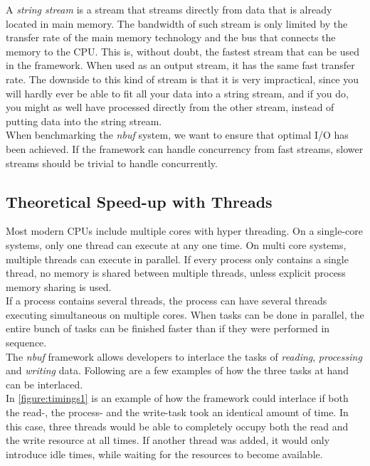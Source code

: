 \documentclass[a4paper]{article}
\newcommand{\nbuf}{\textit{nbuf} }
\begin{document}
A \textit{string stream} is a stream that streams directly from data that is already located in main memory. The bandwidth of such stream is only limited by the transfer rate of the main memory technology and the bus that connects the memory to the CPU. This is, without doubt, the fastest stream that can be used in the framework. When used as an output stream, it has the same fast transfer rate. The downside to this kind of stream is that it is very impractical, since you will hardly ever be able to fit all your data into a string stream, and if you do, you might as well have processed directly from the other stream, instead of putting data into the string stream.\\

When benchmarking the \nbuf system, we want to ensure that optimal I/O has been achieved. If the framework can handle concurrency from fast streams, slower streams should be trivial to handle concurrently.


\subsection{Theoretical Speed-up with Threads}
Most modern CPUs include multiple cores with hyper threading. On a single-core systems, only one thread can execute at any one time. On multi core systems, multiple threads can execute in parallel. If every process only contains a single thread, no memory is shared between multiple threads, unless explicit process memory sharing is used.\\

If a process contains several threads, the process can have several threads executing simultaneous on multiple cores. When tasks can be done in parallel, the entire bunch of tasks can be finished faster than if they were performed in sequence.\\

The \nbuf framework allows developers to interlace the tasks of \textit{reading}, \textit{processing} and \textit{writing} data. Following are a few examples of how the three tasks at hand can be interlaced.\\

In \autoref{figure:timings1} is an example of how the framework could interlace if both the read-, the process- and the write-task took an identical amount of time. In this case, three threads would be able to completely occupy both the read and the write resource at all times. If another thread was added, it would only introduce idle times, while waiting for the resources to become available.\\
\end{document}

